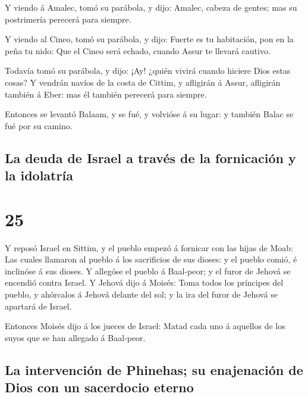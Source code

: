  Y viendo á Amalec, tomó su parábola, y dijo: Amalec,
cabeza de gentes; mas su postrimería perecerá para siempre.

 Y viendo al Cineo, tomó su parábola, y dijo: Fuerte es
tu habitación, pon en la peña tu nido:  Que el Cineo será
echado, cuando Assur te llevará cautivo.

 Todavía tomó su parábola, y dijo: ¡Ay! ¿quién vivirá
cuando hiciere Dios estas cosas?  Y vendrán navíos de la
costa de Cittim, y afligirán á Assur, afligirán también á Eber: mas él
también perecerá para siempre.

 Entonces se levantó Balaam, y se fué, y volvióse á su
lugar: y también Balac se fué por su camino.

\hypertarget{la-deuda-de-israel-a-travuxe9s-de-la-fornicaciuxf3n-y-la-idolatruxeda}{%
\subsection{La deuda de Israel a través de la fornicación y la
idolatría}\label{la-deuda-de-israel-a-travuxe9s-de-la-fornicaciuxf3n-y-la-idolatruxeda}}

\hypertarget{section-04-25}{%
\section{25}\label{section-04-25}}

 Y reposó Israel en Sittim, y el pueblo empezó á fornicar
con las hijas de Moab:  Las cuales llamaron al pueblo á
los sacrificios de sus dioses: y el pueblo comió, é inclinóse á sus
dioses.  Y allegóse el pueblo á Baal-peor; y el furor de
Jehová se encendió contra Israel.  Y Jehová dijo á Moisés:
Toma todos los príncipes del pueblo, y ahórcalos á Jehová delante del
sol; y la ira del furor de Jehová se apartará de Israel.

 Entonces Moisés dijo á los jueces de Israel: Matad cada
uno á aquellos de los suyos que se han allegado á Baal-peor.

\hypertarget{la-intervenciuxf3n-de-phinehas-su-enajenaciuxf3n-de-dios-con-un-sacerdocio-eterno}{%
\subsection{La intervención de Phinehas; su enajenación de Dios con un
sacerdocio
eterno}\label{la-intervenciuxf3n-de-phinehas-su-enajenaciuxf3n-de-dios-con-un-sacerdocio-eterno}}


